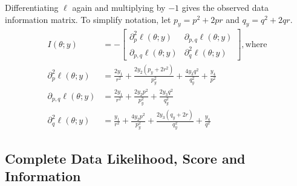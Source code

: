 \documentclass[11pt, oneside]{article}   	%
\begin{document}
\begin{appendices}
    Differentiating $\ell$ again and multiplying by $-1$ gives the observed data information matrix. To simplify notation, let $p_y = p^2 + 2pr$ and $q_y = q^2 + 2qr$.
    \begin{align}
        I(\theta;y) &= - \begin{bmatrix}
            \partial^2_p \ell(\theta; y) & \partial_{p,q} \ell(\theta; y)\\
            \partial_{p,q} \ell(\theta; y) & \partial^2_q \ell(\theta; y)
        \end{bmatrix} \mathrm{, where}\\
        \partial^2_p \ell(\theta; y) &=  \frac{2y_1}{r^2} + \frac{2 y_2 (p_y + 2r^2)}{p_y^2} + \frac{4 y_3 q^2}{q_y^2} + \frac{y_4}{p^2}\\
        \partial_{p,q} \ell(\theta; y) &=  \frac{2y_1}{r^2} + \frac{2 y_2 p^2}{p_y^2} + \frac{2 y_3 q^2}{q_y^2}\\
        \partial^2_q \ell(\theta; y) &=  \frac{y_1}{r^2} + \frac{4 y_2 p^2}{p_y^2} + \frac{2 y_3 (q_y + 2r)}{q_y^2} + \frac{y_4}{q^2}
    \end{align}

    \subsection{Complete Data Likelihood, Score and Information}


\end{appendices}
\end{document}
